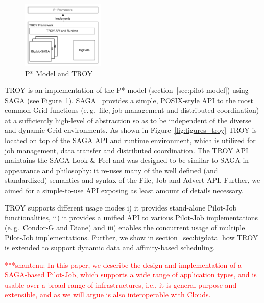 \documentclass[conference,final]{IEEEtran}
\newcommand{\jhanote}[1]{ {\textcolor{red} { ***shantenu: #1 }}}
\newcommand{\msnote}[1]{ {\textcolor{cyan} { ***mark: #1 }}}
\newcommand{\jhanote}[1]{}
\newcommand{\msnote}[1]{}
\begin{document}


\begin{figure}[t]
	\centering
		\includegraphics[width=0.35\textwidth]{figures/pstar_troy.pdf}
	\caption{P* Model and TROY}
	\label{fig:figures_pstar_troy}
\end{figure}

TROY is an implementation of the P* model (section~\ref{sec:pilot-model}) using
SAGA (see Figure~\ref{fig:figures_pstar_troy}). SAGA~\cite{saga_url,saga_gfd90}
provides a simple, POSIX-style API to the most common Grid functions (e.\,g.\
file, job management and distributed coordination) at a sufficiently high-level
of abstraction so as to be independent of the diverse and dynamic Grid
environments. As shown in Figure~\ref{fig:figures_troy} TROY is located on top
of the SAGA API and runtime environment, which is utilized for job management,
data transfer and distributed coordination. The TROY API maintains the SAGA Look
\& Feel and was designed to be similar to SAGA in appearance and philosophy: it
re-uses many of the well defined (and standardized) semantics and syntax of the
File, Job and Advert API. Further, we aimed for a simple-to-use API exposing as
least amount of details necessary. 

TROY supports different usage modes i) it provides stand-alone
Pilot-Job functionalities, ii) it provides a unified API to various
Pilot-Job implementations (e.\,g.\ Condor-G and Diane) and iii)
enables the concurrent usage of multiple Pilot-Job
implementations. Further, we show in section~\ref{sec:bigdata} how
TROY is extended to support dynamic data and affinity-based
scheduling.

\jhanote{In this paper, we describe the design and implementation of a
  SAGA-based Pilot-Job, which supports a wide range of application
  types, and is usable over a broad range of infrastructures, i.e., it
  is general-purpose and extensible, and as we will argue is also
  interoperable with Clouds.}
 
\end{document}
